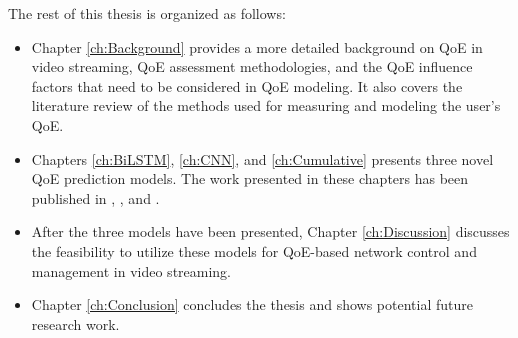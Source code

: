 The rest of this thesis is organized as follows:


\begin{itemize}
  \item Chapter \ref{ch:Background} provides a more detailed background on QoE in video streaming, QoE assessment methodologies, and the QoE influence factors that need to be considered in QoE modeling.
  It also covers the literature review of the methods used for measuring and modeling the user's QoE.
  
  
  \item Chapters \ref{ch:BiLSTM}, \ref{ch:CNN}, and \ref{ch:Cumulative} presents three novel QoE prediction models.
  The work presented in these chapters has been published in \citep{Mine_BiLSTM}, \citep{Mine_CNN}, and \citep{ Mine_Cumulative}.
  

  \item After the three models have been presented, Chapter \ref{ch:Discussion} discusses the feasibility to utilize these models for QoE-based network control and management in video streaming.
  

  \item Chapter \ref{ch:Conclusion} concludes the thesis and shows potential future research work.
\end{itemize}